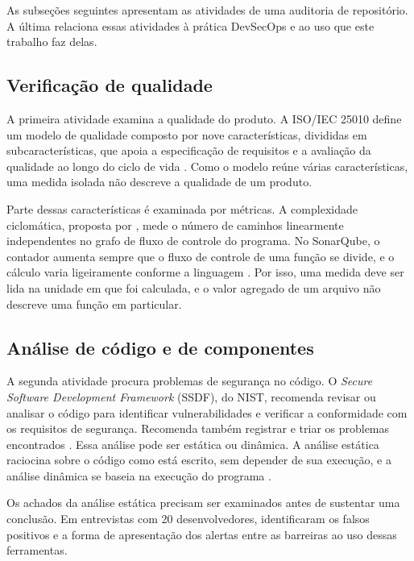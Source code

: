 As subseções seguintes apresentam as atividades de uma auditoria de repositório. A última relaciona essas atividades à prática DevSecOps e ao uso que este trabalho faz delas.

\subsection{Verificação de qualidade}
\label{rt-2-1-1}

A primeira atividade examina a qualidade do produto. A ISO/IEC 25010 define um modelo de qualidade composto por nove características, divididas em subcaracterísticas, que apoia a especificação de requisitos e a avaliação da qualidade ao longo do ciclo de vida \cite{iso25010}. Como o modelo reúne várias características, uma medida isolada não descreve a qualidade de um produto.

Parte dessas características é examinada por métricas. A complexidade ciclomática, proposta por , mede o número de caminhos linearmente independentes no grafo de fluxo de controle do programa. No SonarQube, o contador aumenta sempre que o fluxo de controle de uma função se divide, e o cálculo varia ligeiramente conforme a linguagem \cite{sonarMetrics99}. Por isso, uma medida deve ser lida na unidade em que foi calculada, e o valor agregado de um arquivo não descreve uma função em particular.

\subsection{Análise de código e de componentes}
\label{rt-2-1-2}

A segunda atividade procura problemas de segurança no código. O \textit{Secure Software Development Framework} (SSDF), do NIST, recomenda revisar ou analisar o código para identificar vulnerabilidades e verificar a conformidade com os requisitos de segurança. Recomenda também registrar e triar os problemas encontrados \cite{nistSsdf}. Essa análise pode ser estática ou dinâmica. A análise estática raciocina sobre o código como está escrito, sem depender de sua execução, e a análise dinâmica se baseia na execução do programa \cite{blackIr8397}.

Os achados da análise estática precisam ser examinados antes de sustentar uma conclusão. Em entrevistas com 20 desenvolvedores,  identificaram os falsos positivos e a forma de apresentação dos alertas entre as barreiras ao uso dessas ferramentas. %

